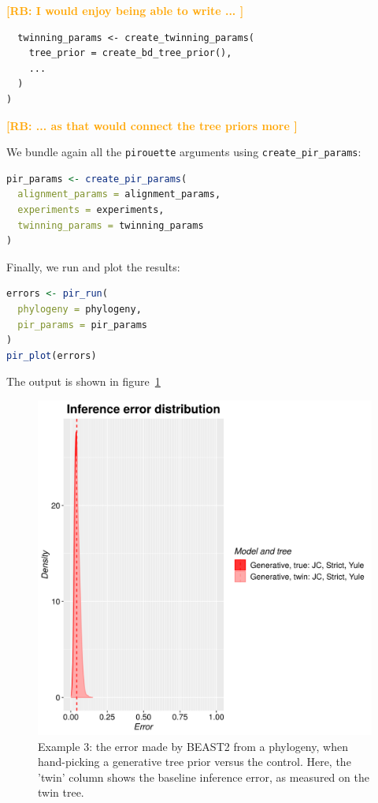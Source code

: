 \documentclass{article}
\newcommand{\richel}[1]{\textcolor{orange}{\textbf{[RB: #1]}}}
\begin{document}
\richel{
  I would enjoy being able to write ...
}
\begin{lstlisting}
  twinning_params <- create_twinning_params(
    tree_prior = create_bd_tree_prior(),
    ...
  )
)
\end{lstlisting}
\richel{
  ... as that would connect the tree priors more
}

We bundle again all the \verb;pirouette; arguments using \verb;create_pir_params;:

\begin{lstlisting}[language=R, floatplacement=ht, frame=single]
pir_params <- create_pir_params(
  alignment_params = alignment_params,
  experiments = experiments,
  twinning_params = twinning_params
)
\end{lstlisting}

Finally, we run and plot the results:

\begin{lstlisting}[language=R, floatplacement=ht, frame=single]
errors <- pir_run(
  phylogeny = phylogeny,
  pir_params = pir_params
)
pir_plot(errors)
\end{lstlisting}

The output is shown in figure~\ref{fig:example_3}

\begin{figure}[ht]
  \includegraphics[width=\textwidth]{example_3/errors.png}
  \caption{
    Example 3: the error made by BEAST2 from a phylogeny, 
    when hand-picking a generative tree prior versus the control.
    Here, the 'twin' column shows the baseline inference error,
    as measured on the twin tree.
  }
  \label{fig:example_3}
\end{figure}
\end{document}
